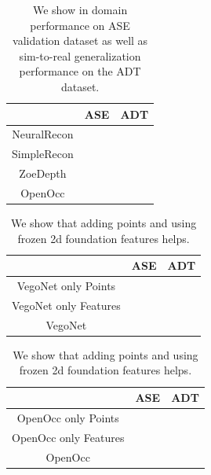 \begin{table}[]
    \centering
    \begin{tabular}{c|c|c}
           & ASE & ADT  \\ \hline
        NeuralRecon & & \\
        SimpleRecon & &\\
        ZoeDepth & &\\
        OpenOcc & &\\
    \end{tabular}
    \caption{We show in domain performance on ASE validation dataset as well as sim-to-real generalization performance on the ADT dataset.}
    \label{tab:surf_perf}
\end{table}

\begin{table}[]
    \centering
    \begin{tabular}{c|c|c}
           & ASE & ADT  \\ \hline
        VegoNet only Points & &\\
        VegoNet only Features & &\\
        VegoNet & &\\
    \end{tabular}
        \begin{tabular}{c|c|c}
           & ASE & ADT  \\ \hline
        OpenOcc only Points & &\\
        OpenOcc only Features & &\\
        OpenOcc & &\\
    \end{tabular}
    \caption{We show that adding points and using frozen 2d foundation features helps.}
    \label{tab:surf_perf}
\end{table}


